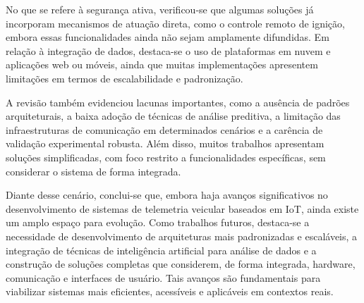 \documentclass[
	article,			%
	11pt,				%
	oneside,			%
	a4paper,			%
	english,			%
	brazil,				%
	sumario=tradicional
	]{abntex2}
\begin{document}
No que se refere à segurança ativa, verificou-se que algumas soluções já incorporam mecanismos de atuação direta, como o controle remoto de ignição, embora essas funcionalidades ainda não sejam amplamente difundidas. Em relação à integração de dados, destaca-se o uso de plataformas em nuvem e aplicações web ou móveis, ainda que muitas implementações apresentem limitações em termos de escalabilidade e padronização.

A revisão também evidenciou lacunas importantes, como a ausência de padrões arquiteturais, a baixa adoção de técnicas de análise preditiva, a limitação das infraestruturas de comunicação em determinados cenários e a carência de validação experimental robusta. Além disso, muitos trabalhos apresentam soluções simplificadas, com foco restrito a funcionalidades específicas, sem considerar o sistema de forma integrada.

Diante desse cenário, conclui-se que, embora haja avanços significativos no desenvolvimento de sistemas de telemetria veicular baseados em IoT, ainda existe um amplo espaço para evolução. Como trabalhos futuros, destaca-se a necessidade de desenvolvimento de arquiteturas mais padronizadas e escaláveis, a integração de técnicas de inteligência artificial para análise de dados e a construção de soluções completas que considerem, de forma integrada, hardware, comunicação e interfaces de usuário. Tais avanços são fundamentais para viabilizar sistemas mais eficientes, acessíveis e aplicáveis em contextos reais.







% 
\postextual
\vspace{40pt}
\setlength{\afterchapskip}{10pt} %



%
%
\end{document}
